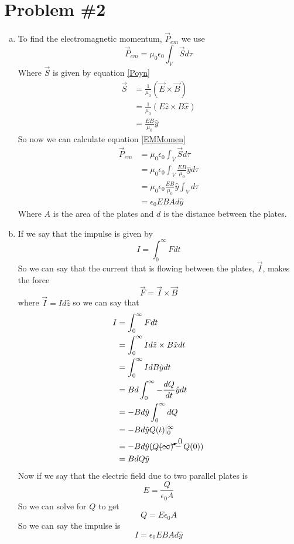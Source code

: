 \documentclass[11pt]{article}
\numberwithin{equation}{section}
\begin{document}
\section{Problem \#2}
\begin{enumerate}[(a)]
\item
To find the electromagnetic momentum, $\vec{P}_{em}$ we use
\begin{equation}
\vec{P}_{em} = \mu_0\epsilon_0\int_V\vec{S}d\tau
\label{EMMomen}
\end{equation}
Where $\vec{S}$ is given by equation \ref{Poyn}
\begin{align*}
\vec{S} &= \frac{1}{\mu_0}(\vec{E}\times\vec{B})\\
&= \frac{1}{\mu_0}(E\hat{z}\times B\hat{x})\\
&= \frac{EB}{\mu_0}\hat{y}
\end{align*}
So now we can calculate equation \ref{EMMomen}
\begin{align*}
\vec{P}_{em} &= \mu_0\epsilon_0\int_V\vec{S}d\tau\\
&= \mu_0\epsilon_0\int_V\frac{EB}{\mu_0}\hat{y}d\tau\\
&= \mu_0\epsilon_0\frac{EB}{\mu_0}\hat{y}\int_Vd\tau\\
&= \epsilon_0EBAd\hat{y}
\end{align*}
Where $A$ is the area of the plates and $d$ is the distance between the plates.

\item
If we say that the impulse is given by
$$I = \int_0^{\infty} Fdt$$
So we can say that the current that is flowing between the plates, $\vec{I}$, makes the force
$$\vec{F} = \vec{I}\times\vec{B}$$
where $\vec{I} = Id\hat{z}$ so we can say that
\begin{align*}
I &= \int_0^{\infty} Fdt\\
&= \int_0^{\infty} Id\hat{z}\times B\hat{x}dt\\
&= \int_0^{\infty} IdB\hat{y}dt\\
&= Bd\int_0^{\infty} -\frac{dQ}{dt}\hat{y}dt\\
&= -Bd\hat{y}\int_0^{\infty}dQ\\
&= -Bd\hat{y}Q(t)|_0^{\infty}\\
&= -Bd\hat{y}(\cancelto{0}{Q(\infty)}-Q(0))\\
&= BdQ\hat{y}
\end{align*}
Now if we say that the electric field due to two parallel plates is 
$$E = \frac{Q}{\epsilon_0A}$$
So we can solve for $Q$ to get
$$Q = E\epsilon_0 A$$
So we can say the impulse is 
$$I = \epsilon_0EBAd\hat{y}$$


\end{enumerate}
\end{document}
